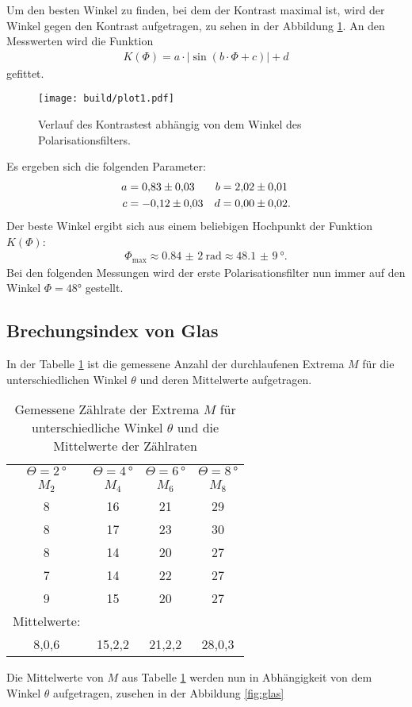 Um den besten Winkel zu finden, bei dem der Kontrast maximal ist, wird
der Winkel gegen den Kontrast aufgetragen, zu sehen in der Abbildung \ref{fig:kontrast}.
An den Messwerten wird die Funktion
\begin{align}
  K\left(\Phi\right) = a \cdot \left| \sin\left(b\cdot\Phi+c \right)\right| + d
\end{align}
gefittet.

\begin{figure}
    \centering
    \texttt{[image: build/plot1.pdf]}
    \caption{Verlauf des Kontrastest abhängig von dem Winkel des Polarisationsfilters.}
    \label{fig:kontrast}
\end{figure}

Es ergeben sich die folgenden Parameter:
\begin{align*}
  a&=\num{0,83\pm0,03}
  &b&=\num{2,02\pm0,01}\\
  c&=\num{-0,12\pm0,03}
  &d&=\num{0\pm0,02}.
\end{align*}
Der beste Winkel ergibt sich aus einem beliebigen
Hochpunkt der Funktion $K(\Phi)$:
\begin{align*}
 \Phi_\mathrm{max}\approx  \SI{0,84(2)}{\radian} \approx \SI{48,1(9)}{\degree}.
\end{align*}
Bei den folgenden Messungen wird der erste Polarisationsfilter
nun immer auf den Winkel $\Phi=48\si{\degree}$ gestellt.


\subsection{Brechungsindex von Glas}
In der Tabelle \ref{tab:glas} ist die gemessene Anzahl der durchlaufenen Extrema $M$
für die unterschiedlichen Winkel $\theta$ und deren Mittelwerte aufgetragen.

\begin{table}
  \centering
  \caption{Gemessene Zählrate der Extrema $M$ für unterschiedliche Winkel $\theta$ und die Mittelwerte der Zählraten}
  \label{tab:glas}
  \begin{tabular}{c c c c}
    \toprule
$\Theta=2\,\si{\degree}$  &  $\Theta=4\,\si{\degree}$ & $\Theta=6\,\si{\degree}$ & $\Theta=8\,\si{\degree}$\\
      $M_2$ &   $M_4$ & $M_6$ &   $M_8$ \\
  \midrule
       8 &   16 &  21 & 29  \\
       8 &   17 &  23 & 30  \\
       8 &   14 &  20 & 27  \\
       7 &   14 &  22 & 27  \\
       9 &   15 &  20 &  27 \\
  \midrule
  Mittelwerte: & &  & \\
  8,0\pm0,6 & 15,2\pm1,2  & 21,2\pm1,2  & 28,0\pm1,3 \\
  \bottomrule
  \end{tabular}
\end{table}
Die Mittelwerte von $M$  aus Tabelle \ref{tab:glas} werden nun in Abhängigkeit von dem Winkel
$\theta$ aufgetragen, zusehen in der Abbildung \ref{fig:glas}


